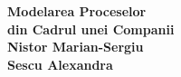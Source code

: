 \begin{titlepage}

\vspace{3in}

\centering
\Huge{\textbf{Modelarea Proceselor\\din Cadrul unei Companii}}\\[2in]

\LARGE{\textbf{Nistor Marian-Sergiu\\Sescu Alexandra}}\\[0.5in]

\end{titlepage}
\newpage